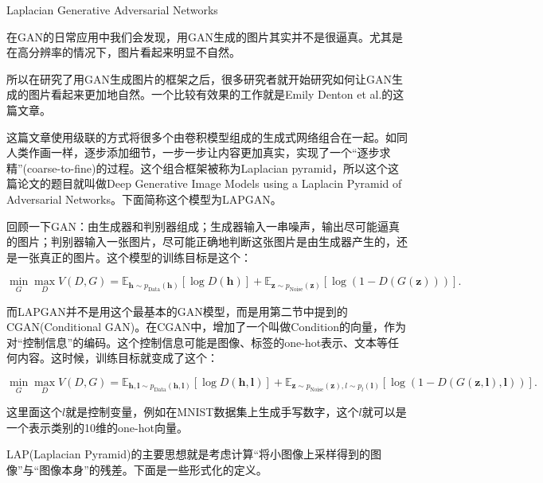 \documentclass{ctexart}
\begin{document}
	\begin{section}{Laplacian Generative Adversarial Networks}
		
		在GAN的日常应用中我们会发现，用GAN生成的图片其实并不是很逼真。尤其是在高分辨率的情况下，图片看起来明显不自然。
		
		所以在研究了用GAN生成图片的框架之后，很多研究者就开始研究如何让GAN生成的图片看起来更加地自然。一个比较有效果的工作就是Emily Denton et al.的这篇文章\cite{denton2015deep}。
		
		这篇文章使用级联的方式将很多个由卷积模型组成的生成式网络组合在一起。如同人类作画一样，逐步添加细节，一步一步让内容更加真实，实现了一个“逐步求精”(coarse-to-fine)的过程。这个组合框架被称为Laplacian pyramid，所以这个这篇论文的题目就叫做Deep Generative Image Models using a Laplacin Pyramid of Adversarial Networks。下面简称这个模型为LAPGAN。
		
		回顾一下GAN：由生成器和判别器组成；生成器输入一串噪声，输出尽可能逼真的图片；判别器输入一张图片，尽可能正确地判断这张图片是由生成器产生的，还是一张真正的图片。这个模型的训练目标是这个：
		
		\begin{equation}
			\mathop{\min}_{G}\mathop{\max}_{D}V(D,G)=\mathbb{E}_{\boldsymbol{h}\sim p_{\text{Data}}(\mathbf{h})}\left[\log D(\boldsymbol{h})\right]+\mathbb{E}_{\boldsymbol{z}\sim p_{\text{Noise}}(\mathbf{z})}\left[\log(1-D(G(\boldsymbol{z})))\right].
		\end{equation}
		
		而LAPGAN并不是用这个最基本的GAN模型，而是用第二节中提到的CGAN(Conditional GAN)。在CGAN中，增加了一个叫做Condition的向量，作为对“控制信息”的编码。这个控制信息可能是图像、标签的one-hot表示、文本等任何内容。这时候，训练目标就变成了这个：
		
		\begin{equation}
			\mathop{\min}_{G}\mathop{\max}_{D}V(D,G)=\mathbb{E}_{\boldsymbol{h},\boldsymbol{l}\sim p_{\text{Data}}(\mathbf{h},\mathbf{l})}\left[\log D(\boldsymbol{h},\boldsymbol{l})\right]+\mathbb{E}_{\boldsymbol{z}\sim p_{\text{Noise}}(\boldsymbol{z}),l\sim p_{l}(\mathbf{l})}\left[\log(1-D(G(\boldsymbol{z},\boldsymbol{l}),\boldsymbol{l}))\right].
		\end{equation}
		
		这里面这个$l$就是控制变量，例如在MNIST数据集上生成手写数字，这个$l$就可以是一个表示类别的10维的one-hot向量。
		
		LAP(Laplacian Pyramid)的主要思想就是考虑计算“将小图像上采样得到的图像”与“图像本身”的残差。下面是一些形式化的定义。
		

\end{section}
\end{document}
